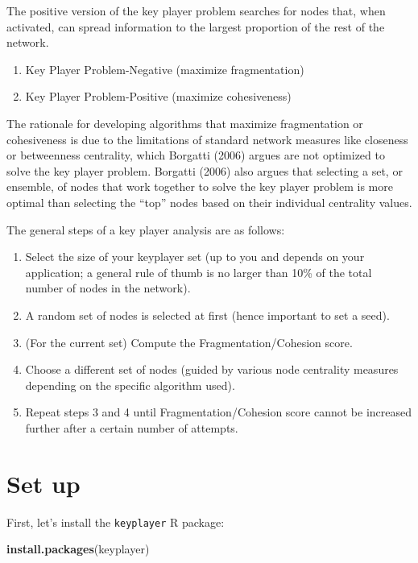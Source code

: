 \documentclass[
]{book}
\newenvironment{Shaded}{\begin{snugshade}}{\end{snugshade}}
\newcommand{\FunctionTok}[1]{\textcolor[rgb]{0.13,0.29,0.53}{\textbf{#1}}}
\newcommand{\NormalTok}[1]{#1}
\newcommand{\StringTok}[1]{\textcolor[rgb]{0.31,0.60,0.02}{#1}}
\providecommand{\tightlist}{%
  \setlength{\itemsep}{0pt}\setlength{\parskip}{0pt}}
\begin{document}
The positive version of the key player problem searches for nodes that, when activated, can spread information to the largest proportion of the rest of the network.

\begin{enumerate}
\def\labelenumi{\arabic{enumi}.}
\tightlist
\item
  Key Player Problem-Negative (maximize fragmentation)
\item
  Key Player Problem-Positive (maximize cohesiveness)
\end{enumerate}

The rationale for developing algorithms that maximize fragmentation or cohesiveness is due to the limitations of standard network measures like closeness or betweenness centrality, which Borgatti (2006) argues are not optimized to solve the key player problem. Borgatti (2006) also argues that selecting a set, or ensemble, of nodes that work together to solve the key player problem is more optimal than selecting the ``top'' nodes based on their individual centrality values.

The general steps of a key player analysis are as follows:

\begin{enumerate}
\def\labelenumi{\arabic{enumi}.}
\tightlist
\item
  Select the size of your keyplayer set (up to you and depends on your application; a general rule of thumb is no larger than 10\% of the total number of nodes in the network).
\item
  A random set of nodes is selected at first (hence important to set a seed).
\item
  (For the current set) Compute the Fragmentation/Cohesion score.
\item
  Choose a different set of nodes (guided by various node centrality measures depending on the specific algorithm used).
\item
  Repeat steps 3 and 4 until Fragmentation/Cohesion score cannot be increased further after a certain number of attempts.
\end{enumerate}

\section{Set up}\label{set-up-1}

First, let's install the \texttt{keyplayer} R package:

\begin{Shaded}
\begin{Highlighting}[]
\FunctionTok{install.packages}\NormalTok{(}\StringTok{\textquotesingle{}keyplayer\textquotesingle{}}\NormalTok{)}
\end{Highlighting}
\end{Shaded}
\end{document}
